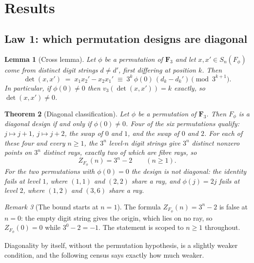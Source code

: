 \documentclass[11pt]{amsart}
\newtheorem{theorem}{Theorem}[section]
\newtheorem{lemma}[theorem]{Lemma}
\theoremstyle{definition}
\theoremstyle{remark}
\newtheorem{remark}[theorem]{Remark}
\begin{document}
\section{Results}
\label{sec:results}

\subsection{Law 1: which permutation designs are diagonal}

\begin{lemma}[Cross lemma]
\label{lem:cross}
Let $\phi$ be a permutation of $\mathbf{F}_3$ and let $x,x'\in S_n(F_\phi)$ come from distinct digit strings $d\neq d'$, first differing at position $k$. Then
\[
\det(x,x') \;=\; x_1x_2'-x_2x_1' \;\equiv\; 3^k\,\phi(0)\,(d_k-d_k') \pmod{3^{k+1}} .
\]
In particular, if $\phi(0)\neq 0$ then $v_3(\det(x,x'))=k$ exactly, so $\det(x,x')\neq 0$.
\end{lemma}

\begin{theorem}[Diagonal classification]
\label{thm:diagonal}
Let $\phi$ be a permutation of $\mathbf{F}_3$. Then $F_\phi$ is a diagonal design if and only if $\phi(0)\neq 0$. Four of the six permutations qualify: $j\mapsto j+1$, $j\mapsto j+2$, the swap of $0$ and $1$, and the swap of $0$ and $2$. For each of these four and every $n\ge 1$, the $3^n$ level-$n$ digit strings give $3^n$ distinct nonzero points on $3^n$ distinct rays, exactly two of which are fibre rays, so
\[
Z_{F_\phi}(n)=3^n-2 \qquad (n\ge 1).
\]
For the two permutations with $\phi(0)=0$ the design is not diagonal: the identity fails at level $1$, where $(1,1)$ and $(2,2)$ share a ray, and $\phi(j)=2j$ fails at level $2$, where $(1,2)$ and $(3,6)$ share a ray.
\end{theorem}

\begin{remark}[The bound starts at $n=1$]
\label{rem:n1}
The formula $Z_{F_\phi}(n)=3^n-2$ is false at $n=0$: the empty digit string gives the origin, which lies on no ray, so $Z_{F_\phi}(0)=0$ while $3^0-2=-1$. The statement is scoped to $n\ge 1$ throughout.
\end{remark}

Diagonality by itself, without the permutation hypothesis, is a slightly weaker condition, and the following census says exactly how much weaker.
\end{document}
